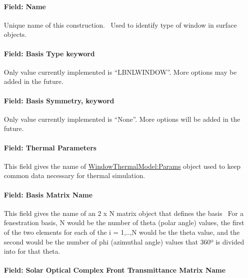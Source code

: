 \paragraph{Field: Name}\label{field-name-32-000}

Unique name of this construction.~ Used to identify type of window in surface objects.

\paragraph{Field: Basis Type keyword}\label{field-basis-type-keyword}

Only value currently implemented is ``LBNLWINDOW''. More options may be added in the future.

\paragraph{Field: Basis Symmetry, keyword}\label{field-basis-symmetry-keyword}

Only value currently implemented is ``None''. More options will be added in the future.

\paragraph{Field: Thermal Parameters}\label{field-thermal-parameters}

This field gives the name of \hyperref[windowthermalmodelparams]{WindowThermalModel:Params} object used to keep common data necessary for thermal simulation.

\paragraph{Field: Basis Matrix Name}\label{field-basis-matrix-name}

This field gives the name of an 2 x N matrix object that defines the basis~ For a fenestration basis, N would be the number of theta (polar angle) values, the first of the two elements for each of the i = 1,..,N would be the theta value, and the second would be the number of phi (azimuthal angle) values that 360º is divided into for that theta.

\paragraph{Field: Solar Optical Complex Front Transmittance Matrix Name}\label{field-solar-optical-complex-front-transmittance-matrix-name}

